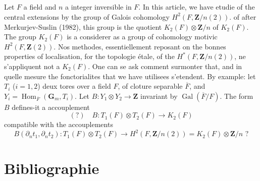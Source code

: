 \documentclass[11pt,a4paper]{article}
\theoremstyle{plain}
\theoremstyle{definition}
\DeclareMathOperator{\Gal}{Gal}
\DeclareMathOperator{\Hom}{Hom}
\begin{document}
\subsection{}\label{7.11}

Let $F$ a field and $n$ a integer inversible in $F$. In this article, we have etudie of the central extensions by the group of Galois cohomology $H^2(F, \mathbf{Z}/n(2))$. of after Merkurjev-Suslin (1982), this group is the quotient $K_2(F) \otimes \mathbf{Z}/n$ of $K_2(F)$. The group $K_2(F)$ is a considerer as a group of cohomology motivic $H^2(F, \mathbf{Z}(2))$. Nos methodes, essentiellement reposant on the bonnes properties of localisation, for the topologie étale, of the $H^*(F, \mathbf{Z}/n(2))$, ne s'appliquent not a $K_2(F)$. One can se ask comment surmonter that, and in quelle mesure the fonctorialites that we have utilisees s'etendent. By example: let $T_i$ ($i = 1, 2$) deux tores over a field $F$, of cloture separable $\overline{F}$, and $Y_i = \Hom_{\overline{F}}(\mathbf{G}_m, T_i)$. Let $B : Y_1 \otimes Y_2 \to \mathbf{Z}$ invariant by $\Gal(\overline{F}/F)$. The form $B$ defines-it a accouplement
\[
(?) \quad B : T_1(F) \otimes T_2(F) \to K_2(F)
\]
compatible with the accouplements
\[
B(\partial_n t_1, \partial_n t_2) : T_1(F) \otimes T_2(F) \to H^2(F, \mathbf{Z}/n(2)) = K_2(F) \otimes \mathbf{Z}/n \text{ ?}
\]

\section*{Bibliographie}
\end{document}
